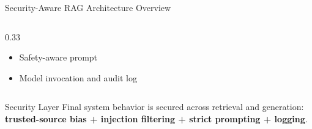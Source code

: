 \documentclass[aspectratio=169]{beamer}
\begin{document}
\begin{frame}{Security-Aware RAG Architecture Overview}
\begin{columns}[t]
\begin{column}{0.33\textwidth}
\begin{itemize}
                \item Safety-aware prompt
                \item Model invocation and audit log
            \end{itemize}
        \end{column}
    \end{columns}
    \vspace{0.3cm}
    \begin{alertblock}{Security Layer}
        Final system behavior is secured across retrieval and generation: \textbf{trusted-source bias + injection filtering + strict prompting + logging}.
    \end{alertblock}
\end{frame}

\end{document}
